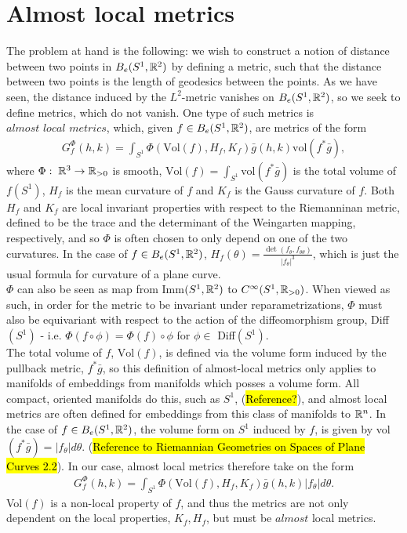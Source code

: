 \section{Almost local metrics}
\label{sec:al-metrics}

The problem at hand is the following: we wish to construct a notion of distance between two points in $B_e(S^1,\mathbb{R}^2)$ by defining a metric, such that the distance between two points is the length of geodesics between the points. As we have seen, the distance induced by the $L^2$-metric vanishes on $B_e(S^1, \mathbb{R}^2)$, so we seek to define metrics, which do not vanish. One type of such metrics is $\textit{almost local metrics}$, which, given $f \in B_e(S^1, \mathbb{R}^2)$, are metrics of the form
\begin{align*}
G_f^\Phi (h,k) = \int_{S^1} \Phi(\text{Vol}(f), H_f, K_f) \bar{g}(h,k) \text{vol}(f^* \bar{g}),
\end{align*}
where $\Phi: \; \mathbb{R}^3 \rightarrow \mathbb{R}_{> 0}$ is smooth, $\text{Vol}(f) = \int_{S^1} \text{vol}(f^* \bar{g})$ is the total volume of $f(S^1)$, $H_f$ is the mean curvature of $f$ and $K_f$ is the Gauss curvature of $f$. Both $H_f$ and $K_f$ are local invariant properties with respect to the Riemanninan metric, defined to be the trace and the determinant of the Weingarten mapping, respectively, and so $\Phi$ is often chosen to only depend on one of the two curvatures. In the case of $f \in B_e(S^1, \mathbb{R}^2)$, $H_f(\theta) = \frac{\det(f_\theta, f_{\theta \theta})}{\left| f_\theta \right| ^3}$, which is just the usual formula for curvature of a plane curve.\\[0.2 cm]
$\Phi$ can also be seen as map from Imm$(S^1, \mathbb{R}^2)$ to $C^\infty (S^1, \mathbb{R}_{> 0})$. When viewed as such, in order for the metric to be invariant under reparametrizations, $\Phi$ must also be equivariant with respect to the action of the diffeomorphism group, Diff$(S^1)$ - i.e. $\Phi(f \circ \phi) = \Phi(f) \circ \phi$ for $\phi \in$ Diff$(S^1)$. \\[0.2 cm]
The total volume of $f$, $\text{Vol}(f)$, is defined via the volume form induced by the pullback metric, $f^*\bar{g}$, so this definition of almost-local metrics only applies to manifolds of embeddings from manifolds which posses a volume form. All compact, oriented manifolds do this, such as $S^1$, (\hl{Reference?}), and almost local metrics are often defined for embeddings from this class of manifolds to $\mathbb{R}^n$. In the case of $f \in B_e(S^1, \mathbb{R}^2)$, the volume form on $S^1$ induced by $f$, is given by vol$(f^*\bar{g}) = \left| f_\theta \right| d \theta$. (\hl{Reference to Riemannian Geometries on Spaces of Plane Curves 2.2}). In our case, almost local metrics therefore take on the form
\begin{align*}
G_f^\Phi (h,k) = \int_{S^1} \Phi(\text{Vol}(f), H_f, K_f) \bar{g}(h,k) \left| f_\theta \right| d \theta.
\end{align*}
Vol$(f)$ is a non-local property of $f$, and thus the metrics are not only dependent on the local properties, $K_f, H_f$, but must be $\textit{almost}$ local metrics. \\[0.2 cm]

